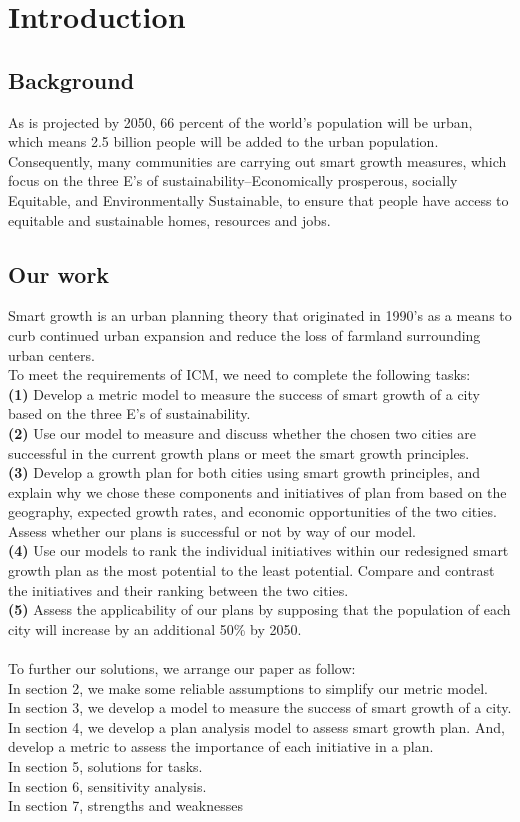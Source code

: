 \documentclass{mcmthesis}
\begin{document}
\section{Introduction}
\subsection{Background}%
As is projected by 2050, 66 percent of the world's population will be urban, which means 2.5 billion people will be added to the urban population. Consequently, many communities are carrying out smart growth measures, which focus on the three E's of sustainability--Economically prosperous, socially Equitable, and Environmentally Sustainable, to ensure that people have access to equitable and sustainable homes, resources and jobs.
\subsection{Our work}
Smart growth is an urban planning theory that originated in 1990's as a means to curb continued urban expansion and reduce the loss of farmland surrounding urban centers.\\
To meet the requirements of ICM, we need to complete the following tasks:\\
{\bf (1) } Develop a metric model to measure the success of smart growth of a city based on the three E's of sustainability.\\
{\bf (2) } Use our model to measure and discuss whether the chosen two cities are successful in the current growth plans or meet the smart growth principles.\\
{\bf (3) } Develop a growth plan for both cities using smart growth principles, and explain why we chose these components and initiatives of plan from based on the geography, expected growth rates, and economic opportunities of the two cities. Assess whether our plans is successful or not by way of our model.\\
{\bf (4) } Use our models to rank the individual initiatives within our redesigned smart growth plan as the most potential to the least potential. Compare and contrast the initiatives and their ranking between the two cities.\\
{\bf (5) } Assess the applicability of our plans by supposing that the population of each city will increase by an additional 50\% by 2050.\\
\\
To further our solutions, we arrange our paper as follow:\\
In section 2, we make some reliable assumptions to simplify our metric model.\\
In section 3, we develop a model to measure the success of smart growth of a city.\\
In section 4, we develop a plan analysis model to assess smart growth plan. And, develop a metric to assess the importance of each initiative in a plan.\\
In section 5, solutions for tasks.\\
In section 6, sensitivity analysis.\\
In section 7, strengths and weaknesses\\
\end{document}
